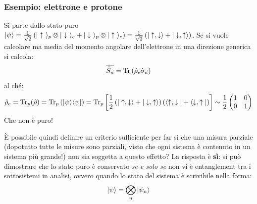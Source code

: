 \subsubsection*{Esempio: elettrone e protone}
Si parte dallo stato puro $\Ket \psi = \sqrthalf \l \Up _p \otimes \Dn _e + \Dn _p \otimes \Up _e \r = \sqrthalf\l \Ket {\u,\d} + \Ket {\d,\u} \r$. Se si vuole calcolare ma media del momento angolare dell'elettrone in una direzione generica si calcola:
\[
    \overline{\S_{\vec n}} = \Tr\l \hr_e \hat\sigma_{\vec n} \r
\]
al ché:
\[
    \hr_e = \Tr_p (\hr) = \Tr_p \l \ketbrabra{\psi} \r = \Tr_p \left[\half \l \Ket {\u,\d} + \Ket {\d,\u} \r\l \Bra {\u,\d} + \Bra {\d,\u} \r \right] \sim \half \begin{pmatrix}
        1 & 0 \\ 0 & 1
    \end{pmatrix}
\]
Che non è puro!

\tab
È possibile quindi definire un criterio sufficiente per far sì che una misura parziale (dopotutto tutte le misure sono parziali, visto che ogni sistema è contenuto in un sistema più grande!) non sia soggetta a questo effetto? La risposta è \textbf{sì}: si può dimostrare che lo stato puro è conservato \textit{se e solo se} non vi è entanglement tra i sottosistemi in analisi, ovvero quando lo stato del sistema è scrivibile nella forma:
\[
    \Ket \psi = \bigotimes_n \Ket {\psi_n}
\]